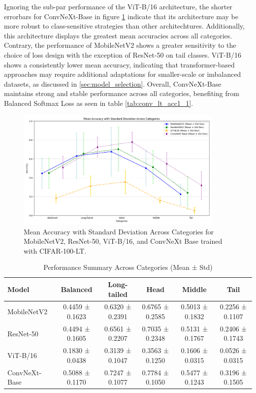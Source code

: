 Ignoring the sub-par performance of the ViT-B/16 architecture, the shorter errorbars for ConvNeXt-Base in figure \ref{fig:mean_loss_comparison} indicate that its architecture may be more robust to class-sensitive strategies than other architechtures. Additionally, this architecture displays the greatest mean accuracies across all categories. Contrary, the performance of MobileNetV2 shows a greater sensitivity to the choice of loss design with the exception of ResNet-50 on tail classes. ViT-B/16 shows a consistently lower mean accuracy, indicating that transformer-based approaches may require additional adaptations for smaller-scale or imbalanced datasets, as discussed in \ref{sec:model_selection}. Overall, ConvNeXt-Base maintains strong and stable performance across all categories, benefiting from Balanced Softmax Loss as seen in table \ref{tab:conv_lt_acc1_1}.

\begin{figure}[h!]
    \centering
    \includegraphics[width=0.9\textwidth]{Images/Plots/mean_loss_comparison.png}
    \caption{Mean Accuracy with Standard Deviation Across Categories for MobileNetV2, ResNet-50, ViT-B/16, and ConvNeXt Base trained with CIFAR-100-LT.}
    \label{fig:mean_loss_comparison}
\end{figure}

\begin{table}[h!]
    \centering
    \caption{Performance Summary Across Categories (Mean ± Std)}
    \scriptsize
    \begin{tabular}{lccccc}
        \toprule
        Model & Balanced & Long-tailed & Head & Middle & Tail \\
        \midrule
        MobileNetV2 
        & 0.4459 ± 0.1623 & 0.6320 ± 0.2391 & 0.6765 ± 0.2585 & 0.5013 ± 0.1832 & 0.2256 ± 0.1107 \\
        ResNet-50 
        & 0.4494 ± 0.1605 & 0.6561 ± 0.2207 & 0.7035 ± 0.2348 & 0.5131 ± 0.1767 & 0.2406 ± 0.1743 \\
        ViT-B/16 
        & 0.1830 ± 0.0438 & 0.3139 ± 0.1047 & 0.3563 ± 0.1250 & 0.1606 ± 0.0315 & 0.0526 ± 0.0315 \\
        ConvNeXt-Base 
        & 0.5088 ± 0.1170 & 0.7247 ± 0.1077 & 0.7784 ± 0.1050 & 0.5477 ± 0.1243 & 0.3196 ± 0.1505 \\
        \bottomrule
    \end{tabular}
    \label{tab:model_performance_summary}
\end{table}

